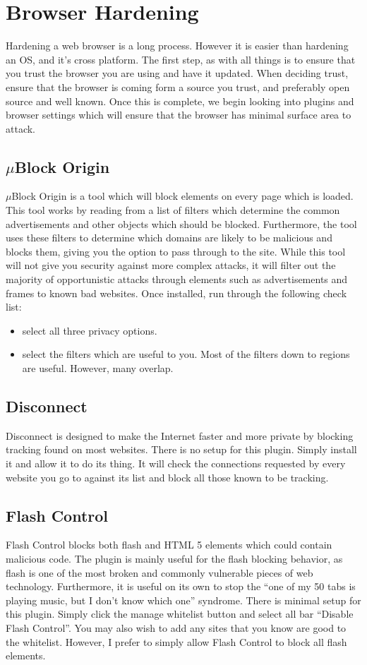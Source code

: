 \documentclass[a4paper,11pt]{report}
\begin{document}
	\section{Browser Hardening}
		Hardening a web browser is a long process. However it is easier than hardening an OS, and it's cross platform. 
		The first step, as with all things is to ensure that you trust the browser you are using and have it updated. 
		When deciding trust, ensure that the browser is coming form a source you trust, and preferably open source and well known. 
		Once this is complete, we begin looking into plugins and browser settings which will ensure that the browser has minimal surface area to attack. 
		\subsection{$\mu{}$Block Origin}
			$\mu$Block Origin is a tool which will block elements on every page which is loaded. 
			This tool works by reading from a list of filters which determine the common advertisements and other objects which should be blocked. 
			Furthermore, the tool uses these filters to determine which domains are likely to be malicious and blocks them, giving you the option to pass through to the site. 
			While this tool will not give you security against more complex attacks, it will filter out the majority of opportunistic attacks through elements such as advertisements and frames to known bad websites. 
			Once installed, run through the following check list: 
			\begin{itemize}
				\item select all three privacy options.
				\item select the filters which are useful to you. 
					Most of the filters down to regions are useful. However, many overlap. 
			\end{itemize}
		\subsection{Disconnect}
			Disconnect is designed to make the Internet faster and more private by blocking tracking found on most websites. 
			There is no setup for this plugin. Simply install it and allow it to do its thing. 
			It will check the connections requested by every website you go to against its list and block all those known to be tracking. 
		\subsection{Flash Control}
			Flash Control blocks both flash and HTML 5 elements which could contain malicious code. 
			The plugin is mainly useful for the flash blocking behavior, as flash is one of the most broken and commonly vulnerable pieces of web technology. 
			Furthermore, it is useful on its own to stop the ``one of my 50 tabs is playing music, but I don't know which one'' syndrome. 
			There is minimal setup for this plugin. Simply click the manage whitelist button and select all bar ``Disable Flash Control''. 
			You may also wish to add any sites that you know are good to the whitelist. 
			However, I prefer to simply allow Flash Control to block all flash elements. 
\end{document}

